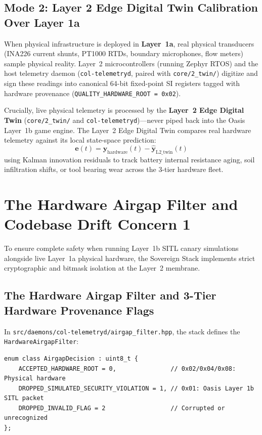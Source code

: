 \subsection{Mode 2: Layer 2 Edge Digital Twin Calibration Over Layer 1a}

When physical infrastructure is deployed in \textbf{Layer~1a}, real physical transducers (INA226 current shunts, PT1000 RTDs, boundary microphones, flow meters) sample physical reality. Layer~2 microcontrollers (running Zephyr RTOS) and the host telemetry daemon (\texttt{col-telemetryd}, paired with \texttt{core/2\_twin/}) digitize and sign these readings into canonical 64-bit fixed-point SI registers tagged with hardware provenance (\texttt{QUALITY\_HARDWARE\_ROOT = 0x02}).

Crucially, live physical telemetry is processed by the \textbf{Layer~2 Edge Digital Twin} (\texttt{core/2\_twin/} and \texttt{col-telemetryd})---never piped back into the Oasis Layer~1b game engine. The Layer~2 Edge Digital Twin compares real hardware telemetry against its local state-space prediction:
\begin{equation}
\mathbf{e}(t) = \mathbf{y}_{\mathrm{hardware}}(t) - \hat{\mathbf{y}}_{\mathrm{L2\_twin}}(t)
\label{eq:telemetry_error}
\end{equation}
using Kalman innovation residuals to track battery internal resistance aging, soil infiltration shifts, or tool bearing wear across the 3-tier hardware fleet.

\section{The Hardware Airgap Filter and Codebase Drift Concern 1}

To ensure complete safety when running Layer~1b SITL canary simulations alongside live Layer~1a physical hardware, the Sovereign Stack implements strict cryptographic and bitmask isolation at the Layer~2 membrane.

\subsection{The Hardware Airgap Filter and 3-Tier Hardware Provenance Flags}

In \texttt{src/daemons/col-telemetryd/airgap\_filter.hpp}, the stack defines the \texttt{HardwareAirgapFilter}:
\begin{verbatim}
enum class AirgapDecision : uint8_t {
    ACCEPTED_HARDWARE_ROOT = 0,               // 0x02/0x04/0x08: Physical hardware
    DROPPED_SIMULATED_SECURITY_VIOLATION = 1, // 0x01: Oasis Layer 1b SITL packet
    DROPPED_INVALID_FLAG = 2                  // Corrupted or unrecognized
};
\end{verbatim}

